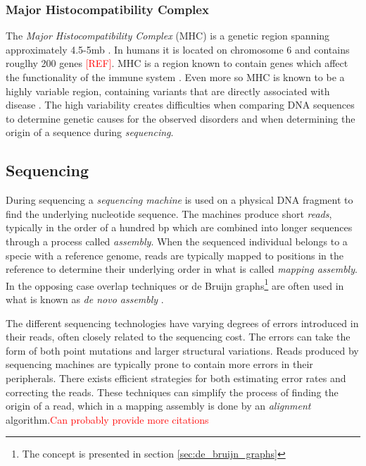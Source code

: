 \documentclass[thesis.tex]{subfiles}
\begin{document}
\subsubsection{Major Histocompatibility Complex}
\label{sec:mhc}
The \textit{Major Histocompatibility Complex} (MHC) is a genetic region spanning approximately 4.5-5mb \cite{improved_genome_inference_in_the_mhc_using_a_population_reference_graph}\cite{canonical_stable_general_mapping_using_context_schemes}. In humans it is located on chromosome 6 and contains rouglhy 200 genes \textcolor{red}{[REF]}. MHC is a region known to contain genes which affect the functionality of the immune system \cite{the_importance_of_immune_gene_variability_in_evolutionary_ecology_and_conservation}. Even more so MHC is known to be a highly variable region, containing variants that are directly associated with disease \cite{variation_analysis_and_gene_annotation_of_eight_mhc_haplotypes}. The high variability creates difficulties when comparing DNA sequences to determine genetic causes for the observed disorders and when determining the origin of a sequence during \textit{sequencing}.
\subsection{Sequencing}
\label{sec:sequencing}
During sequencing a \textit{sequencing machine} is used on a physical DNA fragment to find the underlying nucleotide sequence. The machines produce short \textit{reads}, typically in the order of a hundred bp \cite{sequencing_platforms} which are combined into longer sequences through a process called \textit{assembly}. When the sequenced individual belongs to a specie with a reference genome, reads are typically mapped to positions in the reference to determine their underlying order in what is called \textit{mapping assembly}. In the opposing case overlap techniques \cite{an_eulerian_path_approach_to_dna_fragment_assembly} or de Bruijn graphs\footnote{The concept is presented in section \ref{sec:de_bruijn_graphs}} are often used in what is known as \textit{de novo assembly} \cite[Chapter 1, p. 19]{introduction_to_genomics}.\\
\par\noindent
The different sequencing technologies have varying degrees of errors introduced in their reads, often closely related to the sequencing cost\cite{sequencing_platforms}. The errors can take the form of both point mutations and larger structural variations. Reads produced by sequencing machines are typically prone to contain more errors in their peripherals. There exists efficient strategies for both estimating error rates \cite{estimation_of_sequencing_error_rates_in_short_reads} and correcting the reads\cite{error_correction_of_datasets_with_non_uniform_coverage}. These techniques can simplify the process of finding the origin of a read, which in a mapping assembly is done by an \textit{alignment} algorithm.\textcolor{red}{Can probably provide more citations}
\end{document}
